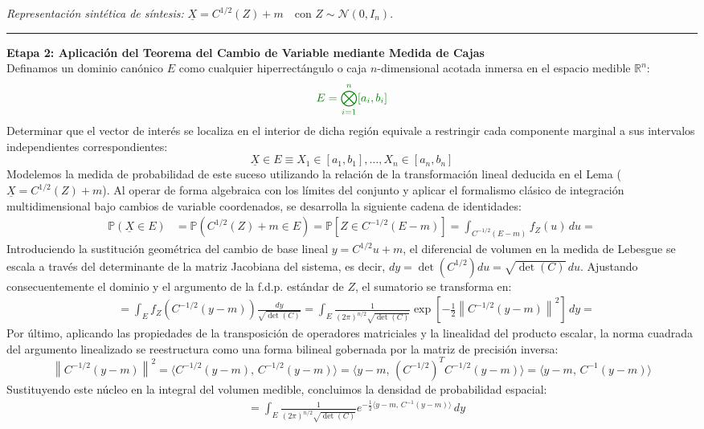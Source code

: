 \begin{flushright}
\textit{Representación sintética de síntesis:} $\underline{X} = C^{1/2}(Z) + m \quad \text{con } Z \sim \mathcal{N}(0, I_n)$.
\end{flushright}

\strut
\hfill \rule{\textwidth}{0.5pt} \hfill
\strut

\noindent \textbf{Etapa 2: Aplicación del Teorema del Cambio de Variable mediante Medida de Cajas} \\
Definamos un dominio canónico $E$ como cualquier hiperrectángulo o caja $n$-dimensional acotada inmersa en el espacio medible $\mathbb{R}^n$:
\[
{\color{green!50!black}E = \bigotimes_{i=1}^{n} [a_i, b_i]}
\]
Determinar que el vector de interés se localiza en el interior de dicha región equivale a restringir cada componente marginal a sus intervalos independientes correspondientes:
\[
\underline{X} \in E \equiv X_1 \in [a_1, b_1], \dots, X_n \in [a_n, b_n]
\]
Modelemos la medida de probabilidad de este suceso utilizando la relación de la transformación lineal deducida en el Lema ($\underline{X} = C^{1/2}(Z) + m$). Al operar de forma algebraica con los límites del conjunto y aplicar el formalismo clásico de integración multidimensional bajo cambios de variable coordenados, se desarrolla la siguiente cadena de identidades:
\begin{align*}
    \mathbb{P}(\underline{X} \in E) &= \mathbb{P}\left(C^{1/2}(Z) + m \in E\right) = \mathbb{P}\left[Z \in C^{-1/2}(E-m)\right] = \int_{C^{-1/2}(E-m)} f_Z(u) \, du = 
\end{align*}
Introduciendo la sustitución geométrica del cambio de base lineal $y = C^{1/2}u + m$, el diferencial de volumen en la medida de Lebesgue se escala a través del determinante de la matriz Jacobiana del sistema, es decir, $dy = \det(C^{1/2}) du = \sqrt{\det(C)} \, du$. Ajustando consecuentemente el dominio y el argumento de la f.d.p. estándar de $Z$, el sumatorio se transforma en:
\begin{align*}
    &= \int_{E} f_Z\left(C^{-1/2}(y-m)\right) \frac{dy}{\sqrt{\det(C)}} = \int_{E} \frac{1}{(2\pi)^{n/2} \sqrt{\det(C)}} \exp\left[ -\frac{1}{2} \left\| C^{-1/2}(y-m) \right\|^2 \right] \, dy = 
\end{align*}
Por último, aplicando las propiedades de la transposición de operadores matriciales y la linealidad del producto escalar, la norma cuadrada del argumento linealizado se reestructura como una forma bilineal gobernada por la matriz de precisión inversa:
\[
\left\| C^{-1/2}(y-m) \right\|^2 = \langle C^{-1/2}(y-m), \, C^{-1/2}(y-m) \rangle = \langle y-m, \, \left(C^{-1/2}\right)^T C^{-1/2}(y-m) \rangle = \langle y-m, \, C^{-1}(y-m) \rangle
\]
Sustituyendo este núcleo en la integral del volumen medible, concluimos la densidad de probabilidad espacial:
\begin{align*}
    &= \int_{E} \frac{1}{(2\pi)^{n/2} \sqrt{\det(C)}} e^{-\frac{1}{2} \langle y-m, \, C^{-1}(y-m) \rangle} \, dy
\end{align*}

